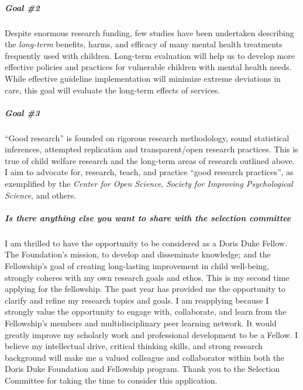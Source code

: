 \documentclass[twocolumn, serif, rga, authordate]{jote-article}
\begin{document}
\subparagraph{Goal \#2} Despite enormous research funding, few studies have
been undertaken describing the \emph{long-term} benefits, harms, and
efficacy of many mental health treatments frequently used with children.
Long-term evaluation will help us to develop more effective policies and
practices for vulnerable children with mental health needs. While
effective guideline implementation will minimize extreme deviations in
care, this goal will evaluate the long-term effects of services.

\subparagraph{Goal \#3} ``Good research'' is founded on rigorous research
methodology, sound statistical inferences, attempted replication and
transparent/open research practices. This is true of child welfare
research and the long-term areas of research outlined above. I aim to
advocate for, research, teach, and practice ``good research practices'',
as exemplified by the \emph{Center for Open Science}, \emph{Society for
Improving Psychological Science}, and others.






\subparagraph{Is there anything else you want to share with the selection committee}


I am thrilled to have the opportunity to be considered as a Doris Duke
Fellow. The Foundation's mission, to develop and disseminate knowledge;
and the Fellowship's goal of creating long-lasting improvement in child
well-being, strongly coheres with my own research goals and ethos. This
is my second time applying for the fellowship. The past year has
provided me the opportunity to clarify and refine my research topics and
goals. I am reapplying because I strongly value the opportunity to
engage with, collaborate, and learn from the Fellowship's members and
multidisciplinary peer learning network. It would greatly improve my
scholarly work and professional development to be a Fellow. I believe my
intellectual drive, critical thinking skills, and strong research
background will make me a valued colleague and collaborator within both
the Doris Duke Foundation and Fellowship program. Thank you to the
Selection Committee for taking the time to consider this application.
\end{document}
